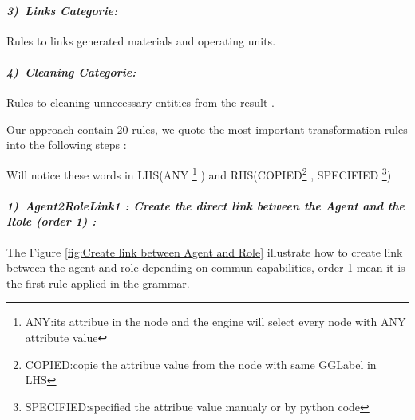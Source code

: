 \paragraph{\emph{3)~Links Categorie:} } 
Rules to links generated materials and operating units.

\paragraph{\emph{4)~Cleaning Categorie:} } 
Rules to cleaning unnecessary entities from the result .


Our approach contain 20 rules, we quote the most important transformation rules into the following steps  : 

Will notice these words in LHS(ANY \footnote{ANY:its attribue in the node and the engine will select every node with ANY attribute value} ) and RHS(COPIED\footnote{COPIED:copie the attribue value from the node with same GGLabel in LHS} , SPECIFIED \footnote{SPECIFIED:specified the attribue value manualy or by python code})
 

\paragraph{\emph{1)~Agent2RoleLink1 : Create the direct link  between the Agent and the Role (order 1) :} } The Figure \ref{fig:Create link between Agent and Role} illustrate how to create link between the agent and role depending on commun capabilities, order 1 mean it is the first rule applied in the grammar. 

